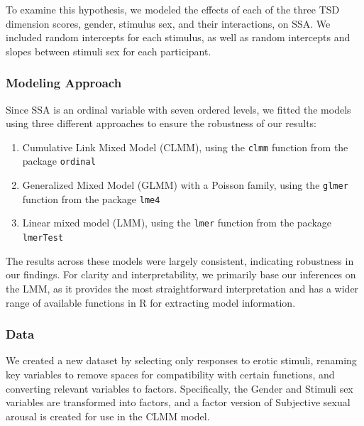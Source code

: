 \documentclass[
  bookmarksnumbered]{article}
\providecommand{\tightlist}{%
  \setlength{\itemsep}{0pt}\setlength{\parskip}{0pt}}
\begin{document}
To examine this hypothesis, we modeled the effects of each of the three TSD dimension scores, gender, stimulus sex, and their interactions, on SSA. We included random intercepts for each stimulus, as well as random intercepts and slopes between stimuli sex for each participant.

\subsubsection{Modeling Approach}\label{modeling-approach}

Since SSA is an ordinal variable with seven ordered levels, we fitted the models using three different approaches to ensure the robustness of our results:

\begin{enumerate}
\def\labelenumi{\arabic{enumi}.}
\tightlist
\item
  Cumulative Link Mixed Model (CLMM), using the \texttt{clmm} function from the package \texttt{ordinal} \autocite{ordinalcit}
\item
  Generalized Mixed Model (GLMM) with a Poisson family, using the \texttt{glmer} function from the package \texttt{lme4} \autocite{lme4cit}
\item
  Linear mixed model (LMM), using the \texttt{lmer} function from the package \texttt{lmerTest} \autocite{lmertestcit}
\end{enumerate}

The results across these models were largely consistent, indicating robustness in our findings. For clarity and interpretability, we primarily base our inferences on the LMM, as it provides the most straightforward interpretation and has a wider range of available functions in R for extracting model information.

\subsubsection{Data}\label{data-1}

We created a new dataset by selecting only responses to erotic stimuli, renaming key variables to remove spaces for compatibility with certain functions, and converting relevant variables to factors. Specifically, the Gender and Stimuli sex variables are transformed into factors, and a factor version of Subjective sexual arousal is created for use in the CLMM model.
\end{document}
